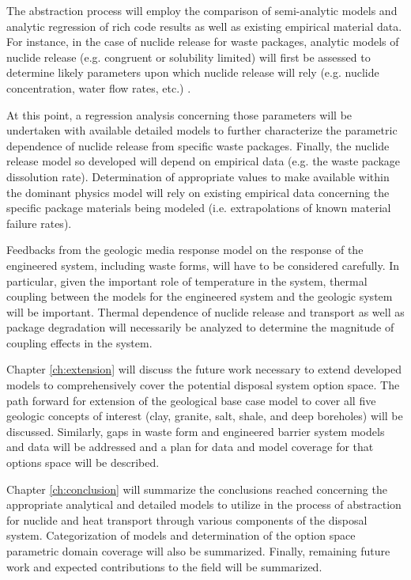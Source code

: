 The abstraction process will employ the comparison of semi-analytic 
models and analytic regression of rich code results as well as 
existing empirical material data. For instance, in the case of nuclide 
release for waste packages, analytic models of nuclide release (e.g. 
congruent or solubility limited) will first be assessed to determine 
likely parameters upon which nuclide release will rely (e.g. nuclide 
concentration, water flow rates, etc.) \cite{ahn_congruent}. 

At this point, a regression analysis concerning those parameters will 
be undertaken with available detailed models to further characterize 
the parametric dependence of nuclide release from specific waste 
packages.  Finally, the nuclide release model so developed will depend 
on empirical data (e.g. the waste package dissolution rate). 
Determination of appropriate values to make available within the 
dominant physics model will rely on existing empirical data concerning 
the specific package materials being modeled (i.e.  extrapolations of 
known material failure rates).  

Feedbacks from the geologic media response model on the response of 
the engineered system, including waste forms, will have to be 
considered carefully.  In particular, given the important role of 
temperature in the system, thermal coupling between the models for the 
engineered system and the geologic system will be important. Thermal 
dependence of nuclide release and transport as well as package 
degradation will necessarily be analyzed to determine the magnitude of 
coupling effects in the system.

Chapter \ref{ch:extension} will discuss the future work necessary to 
extend developed models to comprehensively cover the potential 
disposal system option space. The path forward for extension of the 
geological base case model to cover all five geologic concepts of 
interest (clay, granite, salt, shale, and deep boreholes) will be 
discussed. Similarly, gaps in waste form and engineered barrier system 
models and data will be addressed and a plan for data and model 
coverage for that options space will be described.

Chapter \ref{ch:conclusion} will summarize the conclusions reached 
concerning the appropriate analytical and detailed models to utilize 
in the process of abstraction for nuclide and heat transport through 
various components of the disposal system. Categorization of models 
and determination of the option space parametric domain coverage will 
also be summarized. Finally, remaining future work and expected 
contributions to the field will be summarized. 
